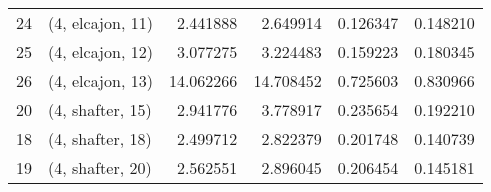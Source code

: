 \begin{tabular}{llrrrr}
24 &  (4, elcajon, 11) &   2.441888 &   2.649914 &   0.126347 &  0.148210 \\
25 &  (4, elcajon, 12) &   3.077275 &   3.224483 &   0.159223 &  0.180345 \\
26 &  (4, elcajon, 13) &  14.062266 &  14.708452 &   0.725603 &  0.830966 \\
20 &  (4, shafter, 15) &   2.941776 &   3.778917 &   0.235654 &  0.192210 \\
18 &  (4, shafter, 18) &   2.499712 &   2.822379 &   0.201748 &  0.140739 \\
19 &  (4, shafter, 20) &   2.562551 &   2.896045 &   0.206454 &  0.145181 \\
\bottomrule
\end{tabular}
